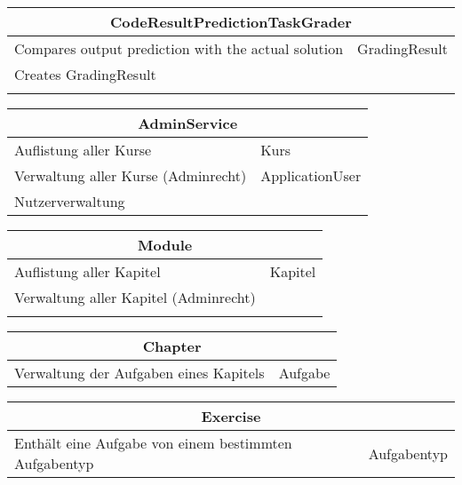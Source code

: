 \documentclass[11pt]{article}
\begin{document}
\begin{table}[h]
\begin{tabularx}{\textwidth}{|X|X|}
\hline
\multicolumn{2}{|c|}{CodeResultPredictionTaskGrader}\\ \hline
Compares output prediction with the actual solution& GradingResult  \\  \hline
Creates GradingResult &  \\ \hline
 & \\ \hline
\end{tabularx}

\end{table}

\begin{table}[h]
\begin{tabularx}{\textwidth}{|X|X|}
\hline
\multicolumn{2}{|c|}{AdminService}\\ \hline
Auflistung aller Kurse & Kurs  \\  \hline
Verwaltung aller Kurse (Adminrecht) & ApplicationUser \\ \hline
Nutzerverwaltung & \\ \hline
\end{tabularx}
\end{table}

\begin{table}[h]
\begin{tabularx}{\textwidth}{|X|X|}
\hline
\multicolumn{2}{|c|}{Module}\\ \hline
Auflistung aller Kapitel & Kapitel  \\  \hline
Verwaltung aller Kapitel (Adminrecht) & \\ \hline
 & \\ \hline
\end{tabularx}
\end{table}

\begin{table}[h]
\begin{tabularx}{\textwidth}{|X|X|}
\hline
\multicolumn{2}{|c|}{Chapter}\\ \hline
Verwaltung der Aufgaben eines Kapitels&Aufgabe   \\  \hline
\end{tabularx}

\end{table}

\begin{table}[h]
\begin{tabularx}{\textwidth}{|X|X|}
\hline
\multicolumn{2}{|c|}{Exercise}\\ \hline
Enthält eine Aufgabe von einem bestimmten Aufgabentyp&Aufgabentyp   \\  \hline
\end{tabularx}

\end{table}
\end{document}
